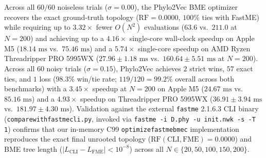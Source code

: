 \documentclass[11pt,a4paper]{article}
\makeatletter
\DeclareRobustCommand{\_}{\ifmmode\nfss@text{\textunderscore}\else\textunderscore\allowbreak\fi}
\theoremstyle{definition}
\makeatother
\begin{document}
\begin{table}[h!]
\centering
\caption{Benchmark 2: Noisy Phylogenetic Distances ($\sigma = 0.15$, Log-Normal Multiplicative Noise).}
\label{tab:bench_noisy}
\vspace{4pt}
\end{table}

Across all $60 / 60$ noiseless trials ($\sigma = 0.00$), the Phylo2Vec BME optimizer recovers the exact ground-truth topology ($\text{RF} = 0.0000$, $100\%$ ties with FastME) while requiring up to $\mathbf{3.32\times}$ fewer $O(N^2)$ evaluations ($63.6$ vs.\ $211.0$ at $N=200$) and achieving up to a $\mathbf{4.16\times}$ single-core wall-clock speedup on Apple M5 ($18.14\text{ ms}$ vs.\ $75.46\text{ ms}$) and a $\mathbf{5.74\times}$ single-core speedup on AMD Ryzen Threadripper PRO 5995WX ($27.96 \pm 1.18\text{ ms}$ vs.\ $160.64 \pm 5.51\text{ ms}$ at $N=200$). Across all $60$ noisy trials ($\sigma = 0.15$), Phylo2Vec achieves $2$ strict wins, $57$ exact ties, and $1$ loss ($98.3\%$ win/tie rate; $119 / 120 = 99.2\%$ overall across both benchmarks) with a $\mathbf{3.45\times}$ speedup at $N=200$ on Apple M5 ($24.67\text{ ms}$ vs.\ $85.16\text{ ms}$) and a $\mathbf{4.93\times}$ speedup on Threadripper PRO 5995WX ($36.91 \pm 3.94\text{ ms}$ vs.\ $181.97 \pm 4.30\text{ ms}$). Validation against the external \texttt{fastme} 2.1.6.3 CLI binary (\texttt{compare\_with\_fastme\_cli.py}, invoked via \texttt{fastme -i D.phy -u init.nwk -s -T 1}) confirms that our in-memory C99 \texttt{optimize\_fastme\_bme\_c} implementation reproduces the exact final unrooted topology ($\text{RF}(\text{CLI}, \text{FME}) = 0.0000$) and BME tree length ($|L_{\text{CLI}} - L_{\text{FME}}| < 10^{-8}$) across all $N \in \{20, 50, 100, 150, 200\}$.
\end{document}
